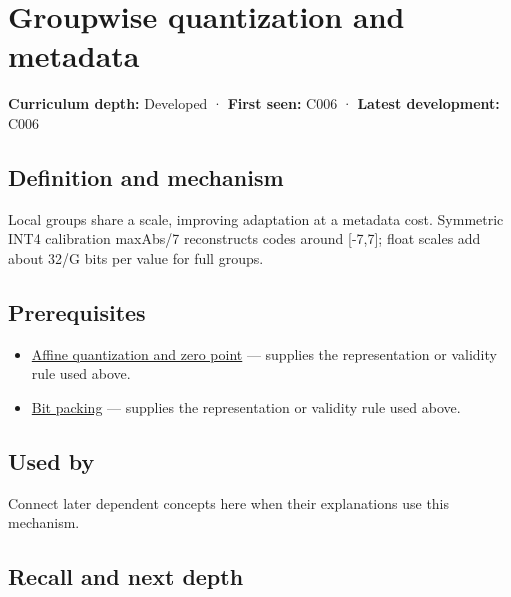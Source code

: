 \hypertarget{appendix-638204c40e8b}{}\label{referencestart:appendix-638204c40e8b}
\section{Groupwise quantization and metadata}\label{appendix-638204c40e8b-groupwise-quantization-and-metadata}

\textbf{Curriculum depth:} Developed · \textbf{First seen:} C006 · \textbf{Latest development:} C006

\begin{allmightroledefinition}

\subsection{Definition and mechanism}\label{appendix-638204c40e8b-definition-and-mechanism}

Local groups share a scale, improving adaptation at a metadata cost. Symmetric INT4 calibration maxAbs/7 reconstructs codes around {[}-7,7{]}; float scales add about 32/G bits per value for full groups.

\end{allmightroledefinition}

\subsection{Prerequisites}\label{appendix-638204c40e8b-prerequisites}

\begin{itemize}
\tightlist
\item
  \hyperref[appendix-d5da3eaabaef]{Affine quantization and zero point} --- supplies the representation or validity rule used above.
\item
  \hyperref[appendix-1f9963e1a5d1]{Bit packing} --- supplies the representation or validity rule used above.
\end{itemize}

\subsection{Used by}\label{appendix-638204c40e8b-used-by}

Connect later dependent concepts here when their explanations use this mechanism.

\subsection{Recall and next depth}\label{appendix-638204c40e8b-recall-and-next-depth}

